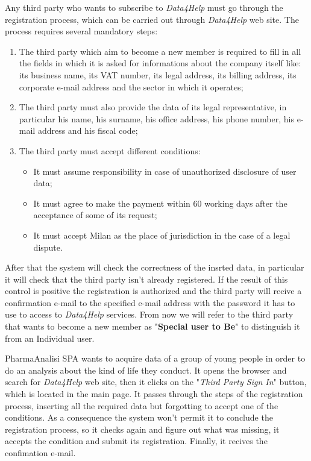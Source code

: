 Any third party who wants to subscribe to \textit{Data4Help} must go through the registration process, which can be carried out through \textit{Data4Help} web site. The process requires several mandatory steps:
\begin{enumerate}
  \item The third party which aim to become a new member is required to fill in all the fields in which it is asked for informations about the company itself like: its business name, its VAT number, its legal address, its billing address, its corporate e-mail address and the sector in which it operates;
  \item The third party must also provide the data of its legal representative, in particular his name, his surname, his office address, his phone number, his e-mail address and his fiscal code;
  \item The third party must accept different conditions:
    \begin{itemize}
      \item It must assume responsibility in case of unauthorized disclosure of user data;
      \item It must agree to make the payment within 60 working days after the acceptance of some of its request;
      \item It must accept Milan as the place of jurisdiction in the case of a legal dispute.
    \end{itemize}
\end{enumerate}
After that the system will check the correctness of the insrted data, in particular it will check that the third party isn't already registered. If the result of this control is positive the registration is authorized and the third party will recive a confirmation e-mail to the specified e-mail address with the password it has to use to access to \textit{Data4Help} services.
From now we will refer to the third party that wants to become a new member as "\textbf{Special user to Be}" to distinguish it from an Individual user.

PharmaAnalisi SPA wants to acquire data of a group of young people in order to do an analysis about the kind of life they conduct. It opens the browser and search for \textit{Data4Help} web site, then it clicks on the "\textit{Third Party Sign In}" button, which is located in the main page. It passes through the steps of the registration process, inserting all the required data but forgotting to accept one of the conditions. As a consequence the system won't permit it to conclude the registration process, so it checks again and figure out what was missing, it accepts the condition and submit its registration. Finally, it recives the confimation e-mail.

